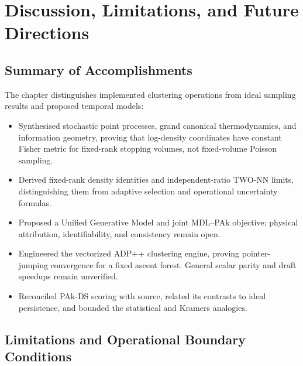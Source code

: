 \section{Discussion, Limitations, and Future Directions}
\label{sec:clustering_discussion}

\subsection{Summary of Accomplishments}
\label{subsec:discussion_accomplishments}

The chapter distinguishes implemented clustering operations from
ideal sampling results and proposed temporal models:
\begin{itemize}[noitemsep,topsep=2pt]
  \item Synthesised stochastic point processes, grand canonical
    thermodynamics, and information geometry, proving that
    log-density coordinates have constant Fisher metric for fixed-rank
    stopping volumes, not fixed-volume Poisson sampling.
  \item Derived fixed-rank density identities and independent-ratio
    TWO-NN limits, distinguishing them from adaptive selection and
    operational uncertainty formulas.
  \item Proposed a Unified Generative Model and joint MDL--PAk objective;
    physical attribution, identifiability, and consistency remain open.
  \item Engineered the vectorized \textsc{ADP++} clustering engine,
    proving pointer-jumping convergence for a fixed ascent forest.
    General scalar parity and draft speedups remain unverified.
  \item Reconciled PAk-DS scoring with source, related its contrasts
    to ideal persistence, and bounded the statistical and Kramers analogies.
\end{itemize}

\subsection{Limitations and Operational Boundary Conditions}
\label{subsec:discussion_limitations}

